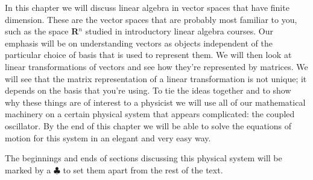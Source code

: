 
In this chapter we will discuss linear algebra in vector spaces that have finite dimension.
These are the vector spaces that are probably most familiar to you, such as the space \textbf{R}$^{n}$ studied in introductory linear algebra courses.
Our emphasis will be on understanding vectors as objects independent of the particular choice of basis that is used to represent them.
We will then look at linear transformations of vectors and see how they're represented by matrices.
We will see that the matrix representation of a linear transformation is not unique; it depends on the basis that you're using.
To tie the ideas together and to show why these things are of interest to a physicist we will use all of our mathematical machinery on a certain physical system that appears complicated: the coupled oscillator.
By the end of this chapter we will be able to solve the equations of motion for this system in an elegant and very easy way.

The beginnings and ends of sections discussing this physical system will be marked by a $\clubsuit$ to set them apart from the rest of the text.


